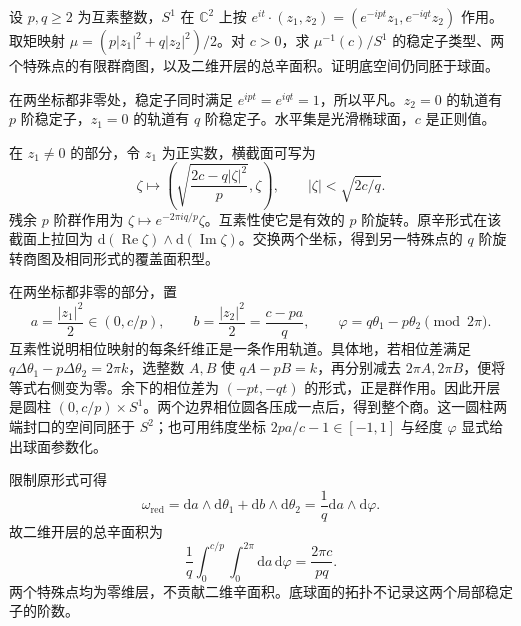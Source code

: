 \begin{optionalexercise}\label{g4:ex:10:weighted-football}
	设 \(p,q\ge2\) 为互素整数，\(S^1\) 在 \(\mathbb C^2\) 上按 \(e^{it}\cdot(z_1,z_2)=(e^{-ipt}z_1,e^{-iqt}z_2)\) 作用。取矩映射 \(\mu=(p|z_1|^2+q|z_2|^2)/2\)。对 \(c>0\)，求 \(\mu^{-1}(c)/S^1\) 的稳定子类型、两个特殊点的有限群商图，以及二维开层的总辛面积。证明底空间仍同胚于球面。
\end{optionalexercise}
\begin{solution}
	在两坐标都非零处，稳定子同时满足 \(e^{ipt}=e^{iqt}=1\)，所以平凡。\(z_2=0\) 的轨道有 \(p\) 阶稳定子，\(z_1=0\) 的轨道有 \(q\) 阶稳定子。水平集是光滑椭球面，\(c\) 是正则值。

	在 \(z_1\neq0\) 的部分，令 \(z_1\) 为正实数，横截面可写为
	\[
		\zeta\longmapsto
		\left(\sqrt{\frac{2c-q|\zeta|^2}{p}},\zeta\right),
		\qquad |\zeta|<\sqrt{2c/q}.
	\]
	残余 \(p\) 阶群作用为 \(\zeta\mapsto e^{-2\pi i q/p}\zeta\)。互素性使它是有效的 \(p\) 阶旋转。原辛形式在该截面上拉回为 \(\mathrm{d}(\operatorname{Re}\zeta)\wedge\mathrm{d}(\operatorname{Im}\zeta)\)。交换两个坐标，得到另一特殊点的 \(q\) 阶旋转商图及相同形式的覆盖面积型。

	在两坐标都非零的部分，置
	\[
		a=\frac{|z_1|^2}{2}\in(0,c/p),
		\qquad b=\frac{|z_2|^2}{2}=\frac{c-pa}{q},
		\qquad \varphi=q\theta_1-p\theta_2\pmod{2\pi}.
	\]
	互素性说明相位映射的每条纤维正是一条作用轨道。具体地，若相位差满足 \(q\Delta\theta_1-p\Delta\theta_2=2\pi k\)，选整数 \(A,B\) 使 \(qA-pB=k\)，再分别减去 \(2\pi A,2\pi B\)，便将等式右侧变为零。余下的相位差为 \((-pt,-qt)\) 的形式，正是群作用。因此开层是圆柱 \((0,c/p)\times S^1\)。两个边界相位圆各压成一点后，得到整个商。这一圆柱两端封口的空间同胚于 \(S^2\)；也可用纬度坐标 \(2pa/c-1\in[-1,1]\) 与经度 \(\varphi\) 显式给出球面参数化。

	限制原形式可得
	\[
		\omega_{\mathrm{red}}
		=\mathrm{d}a\wedge\mathrm{d}\theta_1
		+\mathrm{d}b\wedge\mathrm{d}\theta_2
		=\frac1q\mathrm{d}a\wedge\mathrm{d}\varphi.
	\]
	故二维开层的总辛面积为
	\[
		\frac1q\int_0^{c/p}\!\int_0^{2\pi}\mathrm{d}a\,\mathrm{d}\varphi
		=\frac{2\pi c}{pq}.
	\]
	两个特殊点均为零维层，不贡献二维辛面积。底球面的拓扑不记录这两个局部稳定子的阶数。
\end{solution}


